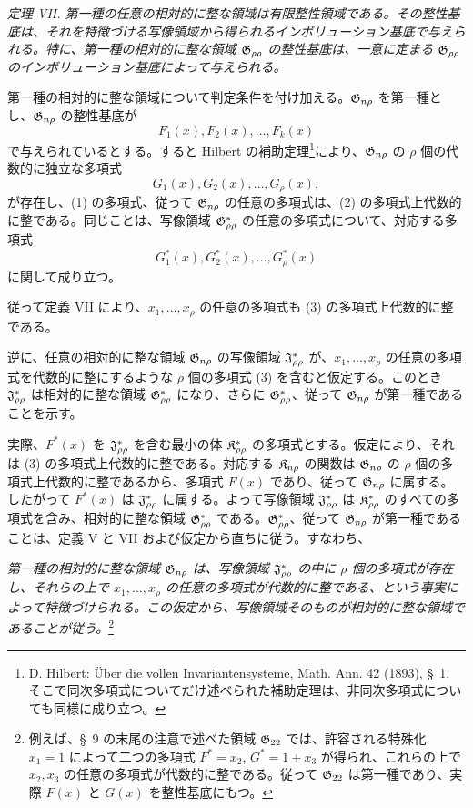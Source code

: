 \documentclass[11pt]{jlreq}
\begin{document}
\emph{定理 VII. 第一種の任意の相対的に整な領域は有限整性領域である。その整性基底は、それを特徴づける写像領域から得られるインボリューション基底で与えられる。特に、第一種の相対的に整な領域 $\mathfrak{G}_{\rho\rho}$ の整性基底は、一意に定まる $\mathfrak{G}_{\rho\rho}$ のインボリューション基底によって与えられる。}

第一種の相対的に整な領域について判定条件を付け加える。$\mathfrak{G}_{n\rho}$ を第一種とし、$\mathfrak{G}_{n\rho}$ の整性基底が
\begin{equation}
  F_1(x),F_2(x),\ldots,F_k(x)
\tag{1}
\end{equation}
で与えられているとする。すると Hilbert の補助定理\footnote{D. Hilbert: Über die vollen Invariantensysteme, Math. Ann. 42 (1893), \S\ 1. そこで同次多項式についてだけ述べられた補助定理は、非同次多項式についても同様に成り立つ。}により、$\mathfrak{G}_{n\rho}$ の $\rho$ 個の代数的に独立な多項式
\begin{equation}
  G_1(x),G_2(x),\ldots,G_\rho(x),
\tag{2}
\end{equation}
が存在し、(1) の多項式、従って $\mathfrak{G}_{n\rho}$ の任意の多項式は、(2) の多項式上代数的に整である。同じことは、写像領域 $\mathfrak{G}^*_{\rho\rho}$ の任意の多項式について、対応する多項式
\begin{equation}
  G_1^*(x),G_2^*(x),\ldots,G_\rho^*(x)
\tag{3}
\end{equation}
に関して成り立つ。

従って定義 VII により、$x_1,\ldots,x_\rho$ の任意の多項式も (3) の多項式上代数的に整である。

逆に、任意の相対的に整な領域 $\mathfrak{G}_{n\rho}$ の写像領域 $\mathfrak{J}^*_{\rho\rho}$ が、$x_1,\ldots,x_\rho$ の任意の多項式を代数的に整にするような $\rho$ 個の多項式 (3) を含むと仮定する。このとき $\mathfrak{J}^*_{\rho\rho}$ は相対的に整な領域 $\mathfrak{G}^*_{\rho\rho}$ になり、さらに $\mathfrak{G}^*_{\rho\rho}$、従って $\mathfrak{G}_{n\rho}$ が第一種であることを示す。

実際、$F^*(x)$ を $\mathfrak{J}^*_{\rho\rho}$ を含む最小の体 $\mathfrak{K}^*_{\rho\rho}$ の多項式とする。仮定により、それは (3) の多項式上代数的に整である。対応する $\mathfrak{K}_{n\rho}$ の関数は $\mathfrak{G}_{n\rho}$ の $\rho$ 個の多項式上代数的に整であるから、多項式 $F(x)$ であり、従って $\mathfrak{G}_{n\rho}$ に属する。したがって $F^*(x)$ は $\mathfrak{J}^*_{\rho\rho}$ に属する。よって写像領域 $\mathfrak{J}^*_{\rho\rho}$ は $\mathfrak{K}^*_{\rho\rho}$ のすべての多項式を含み、相対的に整な領域 $\mathfrak{G}^*_{\rho\rho}$ である。$\mathfrak{G}^*_{\rho\rho}$、従って $\mathfrak{G}_{n\rho}$ が第一種であることは、定義 V と VII および仮定から直ちに従う。すなわち、

\emph{第一種の相対的に整な領域 $\mathfrak{G}_{n\rho}$ は、写像領域 $\mathfrak{J}^*_{\rho\rho}$ の中に $\rho$ 個の多項式が存在し、それらの上で $x_1,\ldots,x_\rho$ の任意の多項式が代数的に整である、という事実によって特徴づけられる。この仮定から、写像領域そのものが相対的に整な領域であることが従う。}\footnote{例えば、\S\ 9 の末尾の注意で述べた領域 $\mathfrak{G}_{22}$ では、許容される特殊化 $x_1=1$ によって二つの多項式 $F^*=x_2$, $G^*=1+x_3$ が得られ、これらの上で $x_2,x_3$ の任意の多項式が代数的に整である。従って $\mathfrak{G}_{22}$ は第一種であり、実際 $F(x)$ と $G(x)$ を整性基底にもつ。}
\end{document}
